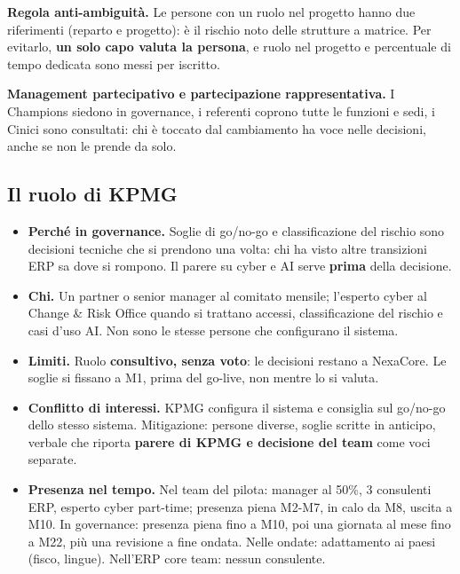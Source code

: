 \documentclass[11pt,a4paper]{article}
\begin{document}
\textbf{Regola anti-ambiguità.} Le persone con un ruolo nel progetto hanno due riferimenti (reparto e progetto): è il rischio noto delle strutture a matrice. Per evitarlo, \textbf{un solo capo valuta la persona}, e ruolo nel progetto e percentuale di tempo dedicata sono messi per iscritto.

\textbf{Management partecipativo e partecipazione rappresentativa.} I Champions siedono in governance, i referenti coprono tutte le funzioni e sedi, i Cinici sono consultati: chi è toccato dal cambiamento ha voce nelle decisioni, anche se non le prende da solo.

\subsection{Il ruolo di KPMG}\label{sec:8.3}
\begin{itemize}
\item \textbf{Perché in governance.} Soglie di go/no-go e classificazione del rischio sono decisioni tecniche che si prendono una volta: chi ha visto altre transizioni ERP sa dove si rompono. Il parere su cyber e AI serve \textbf{prima} della decisione.
\item \textbf{Chi.} Un partner o senior manager al comitato mensile; l'esperto cyber al Change \& Risk Office quando si trattano accessi, classificazione del rischio e casi d'uso AI. Non sono le stesse persone che configurano il sistema.
\item \textbf{Limiti.} Ruolo \textbf{consultivo, senza voto}: le decisioni restano a NexaCore. Le soglie si fissano a M1, prima del go-live, non mentre lo si valuta.
\item \textbf{Conflitto di interessi.} KPMG configura il sistema e consiglia sul go/no-go dello stesso sistema. Mitigazione: persone diverse, soglie scritte in anticipo, verbale che riporta \textbf{parere di KPMG e decisione del team} come voci separate.
\item \textbf{Presenza nel tempo.} Nel team del pilota: manager al 50\%, 3 consulenti ERP, esperto cyber part-time; presenza piena M2-M7, in calo da M8, uscita a M10. In governance: presenza piena fino a M10, poi una giornata al mese fino a M22, più una revisione a fine ondata. Nelle ondate: adattamento ai paesi (fisco, lingue). Nell'ERP core team: nessun consulente.
\end{itemize}
\end{document}
